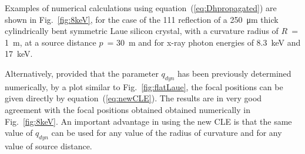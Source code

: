 \documentclass[preprint]{iucr}              %
\newcommand{\inred}[1]{{\color{red}#1}}
\begin{document}
Examples of numerical calculations \inred{using equation~(\ref{eq:Dhpropagated})} are shown in Fig.~\ref{fig:8keV}, for the case of the 111 reflection of a \SI{250}{\micro\meter} thick cylindrically bent symmetric Laue silicon crystal, with a curvature radius of $R$~= \SI{1}{\meter}, at a source distance $p$~= \SI{30}{\meter} and for x-ray photon energies of 8.3~keV and 17~keV. 

\inred{Alternatively, provided that the parameter $q_{dyn}$ has been previously determined numerically,  by a plot similar to Fig.~\ref{fig:flatLaue}, the focal positions can be given directly by equation~(\ref{eq:newCLE}). The results are in very good agreement with the focal positions obtained obtained numerically in Fig.~\ref{fig:8keV}. An important advantage in using the new CLE is that the same value of $q_{dyn}$ can be used for any value of the radius of curvature and for any value of source distance. 
}
\end{document}
